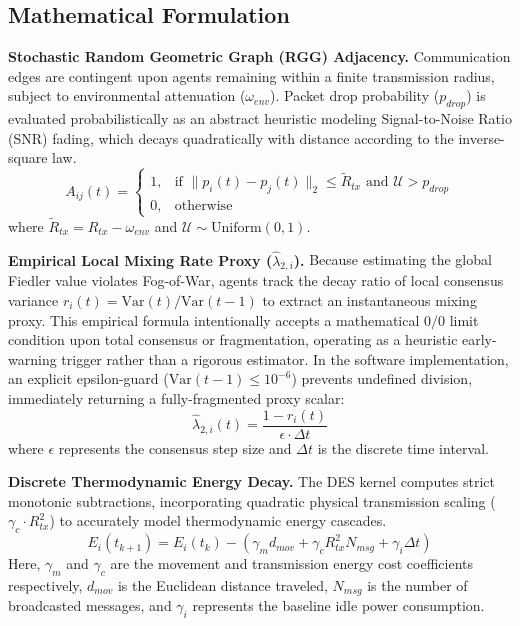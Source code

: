 \documentclass[conference]{IEEEtran}
\begin{document}
\subsection{Mathematical Formulation}

\noindent \textbf{Stochastic Random Geometric Graph (RGG) Adjacency.}
Communication edges are contingent upon agents remaining within a finite transmission radius, subject to environmental attenuation ($\omega_{env}$). Packet drop probability ($p_{drop}$) is evaluated probabilistically as an abstract heuristic modeling Signal-to-Noise Ratio (SNR) fading, which decays quadratically with distance according to the inverse-square law.
\begin{equation}
A_{ij}(t) = 
\begin{cases} 
1, & \text{if } \|p_i(t) - p_j(t)\|_2 \le \tilde{R}_{tx} \text{ and } \mathcal{U} > p_{drop} \\ 
0, & \text{otherwise} 
\end{cases}
\end{equation}
where $\tilde{R}_{tx} = R_{tx} - \omega_{env}$ and $\mathcal{U} \sim \text{Uniform}(0,1)$.

\noindent \textbf{Empirical Local Mixing Rate Proxy ($\hat{\lambda}_{2,i}$).}
Because estimating the global Fiedler value violates Fog-of-War, agents track the decay ratio of local consensus variance $r_i(t) = \text{Var}(t) / \text{Var}(t-1)$ to extract an instantaneous mixing proxy. This empirical formula intentionally accepts a mathematical $0/0$ limit condition upon total consensus or fragmentation, operating as a heuristic early-warning trigger rather than a rigorous estimator. In the software implementation, an explicit epsilon-guard ($\text{Var}(t-1) \le 10^{-6}$) prevents undefined division, immediately returning a fully-fragmented proxy scalar:
\begin{equation}
\hat{\lambda}_{2,i}(t) = \frac{1 - r_i(t)}{\epsilon \cdot \Delta t}
\end{equation}
where $\epsilon$ represents the consensus step size and $\Delta t$ is the discrete time interval.

\noindent \textbf{Discrete Thermodynamic Energy Decay.}
The DES kernel computes strict monotonic subtractions, incorporating quadratic physical transmission scaling ($\gamma_c \cdot R_{tx}^2$) to accurately model thermodynamic energy cascades.
\begin{equation}
E_i(t_{k+1}) = E_i(t_k) - \left( \gamma_m d_{mov} + \gamma_c R_{tx}^2 N_{msg} + \gamma_i \Delta t \right)
\end{equation}
Here, $\gamma_m$ and $\gamma_c$ are the movement and transmission energy cost coefficients respectively, $d_{mov}$ is the Euclidean distance traveled, $N_{msg}$ is the number of broadcasted messages, and $\gamma_i$ represents the baseline idle power consumption.
\end{document}
